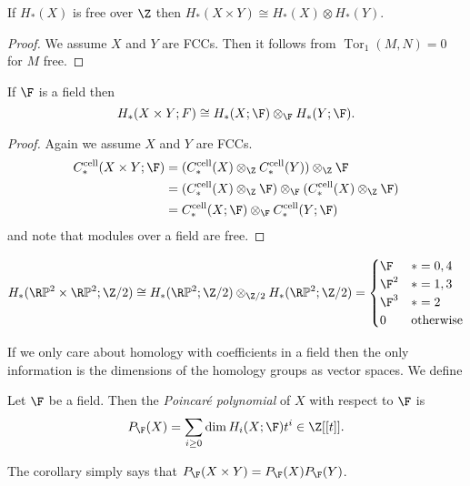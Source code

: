 \documentclass[a4paper]{article}
\renewcommand*{\P}{\mathbb{P}}
\newcommand{\cell}{\mathrm{cell}}
\DeclareMathOperator{\Tor}{Tor} %
\begin{document}
\begin{corollary}
  If \(H_*(X)\) is free over \(\Z\) then \(H_*(X \times Y) \cong H_*(X) \otimes H_*(Y)\).
\end{corollary}

\begin{proof}
  We assume \(X\) and \(Y\) are FCCs. Then it follows from \(\Tor_1(M, N) = 0\) for \(M\) free.
\end{proof}

\begin{corollary}
  If \(\F\) is a field then
  \[
    H_*(X \times Y; F) \cong H_*(X; \F) \otimes_\F H_*(Y; \F).
  \]
\end{corollary}

\begin{proof}
  Again we assume \(X\) and \(Y\) are FCCs.
  \begin{align*}
    C_*^\cell(X \times Y; \F)
    &= (C_*^\cell(X) \otimes_\Z C_*^\cell(Y)) \otimes_\Z \F \\
    &= (C_*^\cell(X) \otimes_\Z \F) \otimes_\F (C_*^\cell(X) \otimes_\Z \F) \\
    &= C_*^\cell(X; \F) \otimes_\F C_*^\cell(Y; \F)
  \end{align*}
  and note that modules over a field are free.
\end{proof}

\begin{eg}
  \[
    H_*(\R\P^2 \times \R\P^2; \Z/2)
    \cong H_*(\R\P^2; \Z/2) \otimes_{\Z/2} H_*(\R\P^2; \Z/2)
    =
    \begin{cases}
      \F & * = 0, 4 \\
      \F^2 & * = 1, 3 \\
      \F^3 & * = 2 \\
      0 & \text{otherwise}
    \end{cases}
  \]
\end{eg}

If we only care about homology with coefficients in a field then the only information is the dimensions of the homology groups as vector spaces. We define

\begin{definition}
  Let \(\F\) be a field. Then the \emph{Poincaré polynomial} of \(X\) with respect to \(\F\) is
  \[
    P_\F(X) = \sum_{i \geq 0} \dim H_i(X; \F) t^i \in \Z[[t]].
  \]
\end{definition}

The corollary simply says that \(P_\F(X \times Y) = P_\F(X) P_\F(Y)\).
\end{document}
